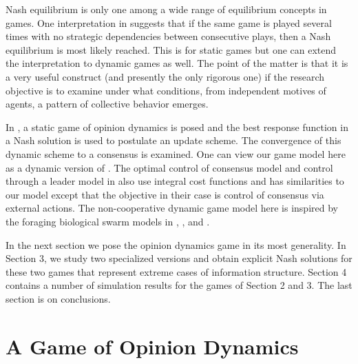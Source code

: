\documentclass[10pt, conference, compsocconf]{IEEEtran}
\begin{document}
Nash equilibrium is only one among a wide range of equilibrium concepts in games.
One interpretation in  \cite{osborne} suggests that if the same game is played several times with no strategic dependencies between consecutive plays, then a Nash equilibrium is most likely reached. This is for static games but one can extend the interpretation to dynamic games as well. The point of the matter is that it is a very useful construct (and presently the only rigorous one) if the research objective is to examine under what conditions, from independent motives of agents, a pattern of collective behavior emerges.

In \cite{ghaderi}, a static game of opinion dynamics is posed and the best response function in a Nash solution is used to postulate an update scheme. The convergence of this dynamic scheme to a consensus is examined. One can view our game model here as a dynamic version of \cite{ghaderi}. The optimal control of consensus model and control through a leader model in \cite{albi} also use integral cost functions and has similarities to our model except that  the objective in their case is control of consensus via external actions. The non-cooperative dynamic game model here is inspired by the foraging biological swarm models in \cite{ozguler}, \cite{ozguler2}, and \cite{ozguler3}.

In the next section we pose the opinion dynamics game in its most generality. In Section 3, we study two specialized versions and obtain explicit Nash solutions for these two games that represent extreme cases of information structure. Section 4 contains a number of simulation results for the games of Section 2 and 3. The last section is on conclusions.


\section{A Game of Opinion Dynamics}
\end{document}

